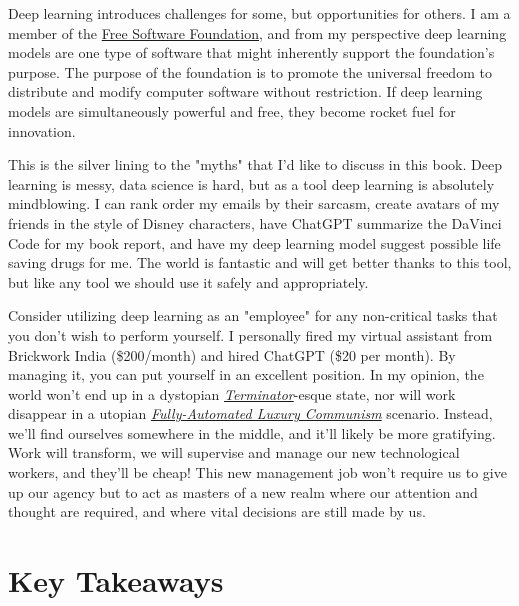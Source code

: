 Deep learning introduces challenges for some, but opportunities for others. I am a member of the \href{https://www.fsf.org/}{Free Software Foundation}, and from my perspective deep learning models are one type of software that might inherently support the foundation's purpose. The purpose of the foundation is to promote the universal freedom to distribute and modify computer software without restriction. If deep learning models are simultaneously powerful and free, they become rocket fuel for innovation. 

This is the silver lining to the "myths" that I'd like to discuss in this book. Deep learning is messy, data science is hard, but as a tool deep learning is absolutely mindblowing. I can rank order my emails by their sarcasm, create avatars of my friends in the style of Disney characters, have ChatGPT summarize the DaVinci Code for my book report, and have my deep learning model suggest possible life saving drugs for me. The world is fantastic and will get better thanks to this tool, but like any tool we should use it safely and appropriately.  

Consider utilizing deep learning as an "employee" for any non-critical tasks that you don't wish to perform yourself. I personally fired my virtual assistant from Brickwork India (\$200/month) and hired ChatGPT (\$20 per month). By managing it, you can put yourself in an excellent position. In my opinion, the world won't end up in a dystopian \href{https://en.wikipedia.org/wiki/The_Terminator}{\textit{Terminator}}-esque state, nor will work disappear in a utopian \href{https://en.wikipedia.org/wiki/Fully_Automated_Luxury_Communism}{\textit{Fully-Automated Luxury Communism}} scenario. Instead, we'll find ourselves somewhere in the middle, and it'll likely be more gratifying. Work will transform, we will supervise and manage our new technological workers, and they'll be cheap! This new management job won't require us to give up our agency but to act as masters of a new realm where our attention and thought are required, and where vital decisions are still made by us.


\section{Key Takeaways}

